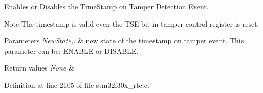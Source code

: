 Enables or Disables the Time\-Stamp on Tamper Detection Event. 

\begin{DoxyNote}{Note}
The timestamp is valid even the T\-S\-E bit in tamper control register is reset. 
\end{DoxyNote}

\begin{DoxyParams}{Parameters}
{\em New\-State,\-:} & new state of the timestamp on tamper event. This parameter can be\-: E\-N\-A\-B\-L\-E or D\-I\-S\-A\-B\-L\-E. \\
\hline
\end{DoxyParams}

\begin{DoxyRetVals}{Return values}
{\em None} & \\
\hline
\end{DoxyRetVals}


Definition at line 2105 of file stm32f30x\-\_\-rtc.\-c.

